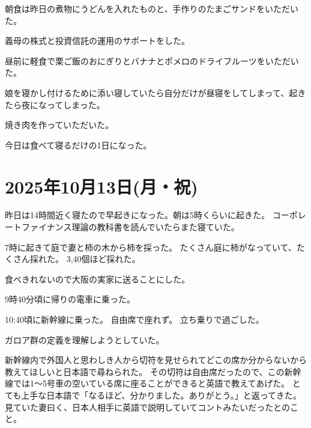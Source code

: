 \documentclass[uplatex]{jsarticle}
\begin{document}
朝食は昨日の煮物にうどんを入れたものと、手作りのたまごサンドをいただいた。

義母の株式と投資信託の運用のサポートをした。

昼前に軽食で栗ご飯のおにぎりとバナナとポメロのドライフルーツをいただいた。

娘を寝かし付けるために添い寝していたら自分だけが昼寝をしてしまって、起きたら夜になってしまった。

焼き肉を作っていただいた。

今日は食べて寝るだけの1日になった。

\section{2025年10月13日(月・祝)}

昨日は14時間近く寝たので早起きになった。朝は5時くらいに起きた。
コーポレートファイナンス理論の教科書を読んでいたらまた寝ていた。

7時に起きて庭で妻と柿の木から柿を採った。
たくさん庭に柿がなっていて、たくさん採れた。
3,40個ほど採れた。

食べきれないので大阪の実家に送ることにした。

9時40分頃に帰りの電車に乗った。

10:40頃に新幹線に乗った。
自由席で座れず。
立ち乗りで過ごした。

ガロア群の定義を理解しようとしていた。

新幹線内で外国人と思わしき人から切符を見せられてどこの席か分からないから教えてほしいと日本語で尋ねられた。
その切符は自由席だったので、この新幹線では1〜5号車の空いている席に座ることができると英語で教えてあげた。
とても上手な日本語で「なるほど、分かりました。ありがとう。」と返ってきた。
見ていた妻曰く、日本人相手に英語で説明していてコントみたいだったとのこと。
\end{document}
